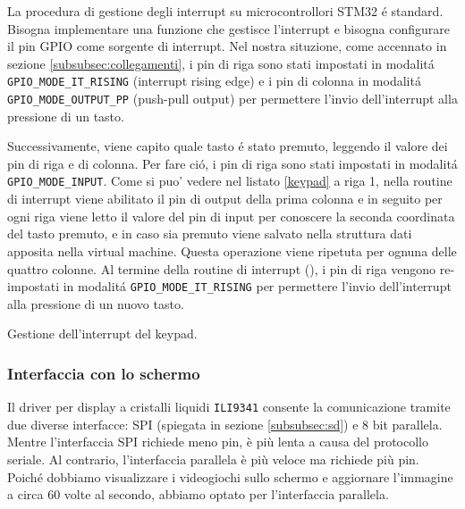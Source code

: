 \documentclass[a4paper]{article}
\begin{document}
La procedura di gestione degli interrupt su microcontrollori STM32 é standard. Bisogna implementare una funzione che gestisce l'interrupt e bisogna configurare il pin GPIO come sorgente di interrupt. Nel nostra situzione, come accennato in sezione \ref{subsubsec:collegamenti}, i pin di riga sono stati impostati in modalitá \texttt{GPIO\_MODE\_IT\_RISING} (interrupt rising edge) e i pin di colonna in modalitá \texttt{GPIO\_MODE\_OUTPUT\_PP} (push-pull output) per permettere l'invio dell'interrupt alla pressione di un tasto.

Successivamente, viene capito quale tasto é stato premuto, leggendo il valore dei pin di riga e di colonna. Per fare ció, i pin di riga sono stati impostati in modalitá \texttt{GPIO\_MODE\_INPUT}. Come si puo' vedere nel listato \ref{keypad} a riga 1, nella routine di interrupt viene abilitato il pin di output della prima colonna e in seguito per ogni riga viene letto il valore del pin di input per conoscere la seconda coordinata del tasto premuto, e in caso sia premuto viene salvato nella struttura dati apposita nella virtual machine. Questa operazione viene ripetuta per ognuna delle quattro colonne.
Al termine della routine di interrupt ({}), i pin di riga vengono re-impostati in modalitá \texttt{GPIO\_MODE\_IT\_RISING} per permettere l'invio dell'interrupt alla pressione di un nuovo tasto.

\begin{Listing}[h!t] %
    \centering
    \caption{Gestione dell'interrupt del keypad.}
    \label{keypad}
\end{Listing}

\subsubsection{Interfaccia con lo schermo}

Il driver per display a cristalli liquidi \texttt{ILI9341} consente la comunicazione tramite due diverse interfacce: SPI (spiegata in sezione \ref{subsubsec:sd}) e 8 bit parallela. Mentre l'interfaccia SPI richiede meno pin, è più lenta a causa del protocollo seriale. Al contrario, l'interfaccia parallela è più veloce ma richiede più pin. Poiché dobbiamo visualizzare i videogiochi sullo schermo e aggiornare l'immagine a circa 60 volte al secondo, abbiamo optato per l'interfaccia parallela.
\end{document}
